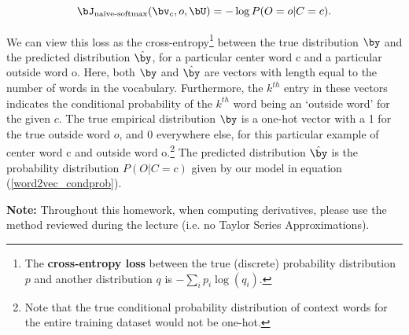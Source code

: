 \begin{equation} 
\bJ_{\text{naive-softmax}}(\bv_c, o, \bU) = -\log P(O=o| C=c).
\label{naive-softmax}
\end{equation}

We can view this loss as the cross-entropy\footnote{The \textbf{cross-entropy loss} between the true (discrete) probability distribution $p$ and another distribution $q$ is $-\sum_i p_i \log(q_i)$.} between the true distribution $\by$ and the predicted distribution $\hat{\by}$, for a particular center word c and a particular outside word o. 
Here, both $\by$ and $\hat{\by}$ are vectors with length equal to the number of words in the vocabulary.
Furthermore, the $k^{th}$ entry in these vectors indicates the conditional probability of the $k^{th}$ word being an `outside word' for the given $c$. 
The true empirical distribution $\by$ is a one-hot vector with a 1 for the true outside word $o$, and 0 everywhere else, for this particular example of center word c and outside word o.\footnote{Note that the true conditional probability distribution of context words for the entire training dataset would not be one-hot.}
The predicted distribution $\hat{\by}$ is the probability distribution $P(O|C=c)$ given by our model in equation (\ref{word2vec_condprob}). \newline

\textbf{Note:} Throughout this homework, when computing derivatives, please use the method reviewed during the lecture (i.e. no Taylor Series Approximations).

